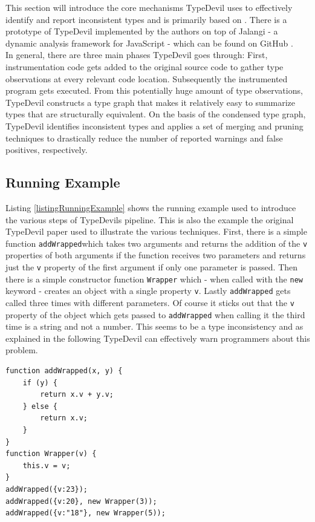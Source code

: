 \documentclass[runningheads,a4paper]{llncs}
\begin{document}
This section will introduce the core mechanisms TypeDevil uses to effectively identify and report inconsistent types and is primarily based on \cite{DBLP:conf/icse/PradelSS15}.
There is a prototype of TypeDevil implemented by the authors on top of Jalangi \cite{DBLP:conf/sigsoft/SenKBG13a} - a dynamic analysis framework for JavaScript - which can be found on GitHub \cite{TypeDevilGitHub}.\\
In general, there are three main phases TypeDevil goes through: 
First, instrumentation code gets added to the original source code to gather type observations at every relevant code location.
Subsequently the instrumented program gets executed.
From this potentially huge amount of type observations, TypeDevil constructs a type graph that makes it relatively easy to summarize types that are structurally equivalent.
On the basis of the condensed type graph, TypeDevil identifies inconsistent types and applies a set of merging and pruning techniques to drastically reduce the number of reported warnings and false positives, respectively.

\subsection{Running Example}
Listing \ref{listingRunningExample} shows the running example used to introduce the various steps of TypeDevils pipeline.
This is also the example the original TypeDevil paper used to illustrate the various techniques.
First, there is a simple function \lstinline[columns=fixed]{addWrapped}which takes two arguments and returns the addition of the \lstinline[columns=fixed]{v} properties of both arguments if the function receives two parameters and returns just the \lstinline[columns=fixed]{v} property of the first argument if only one parameter is passed.
Then there is a simple constructor function \lstinline[columns=fixed]{Wrapper} which - when called with the \lstinline[columns=fixed]{new} keyword - creates an object with a single property \lstinline[columns=fixed]{v}.
Lastly \lstinline[columns=fixed]{addWrapped} gets called three times with different parameters.
Of course it sticks out that the \lstinline[columns=fixed]{v} property of the object which gets passed to \lstinline[columns=fixed]{addWrapped} when calling it the third time is a string and not a number.
This seems to be a type inconsistency and as explained in the following TypeDevil can effectively warn programmers about this problem.

\medskip\medskip
\lstset{language=javascript}
\begin{minipage}{\linewidth}
\begin{lstlisting}[frame=single, caption=Running Example, label=listingRunningExample]
function addWrapped(x, y) {
    if (y) {
        return x.v + y.v;
    } else {
        return x.v;
    }
}
function Wrapper(v) {
    this.v = v;
}
addWrapped({v:23});
addWrapped({v:20}, new Wrapper(3));
addWrapped({v:"18"}, new Wrapper(5));
\end{lstlisting}
\end{minipage}
\end{document}
